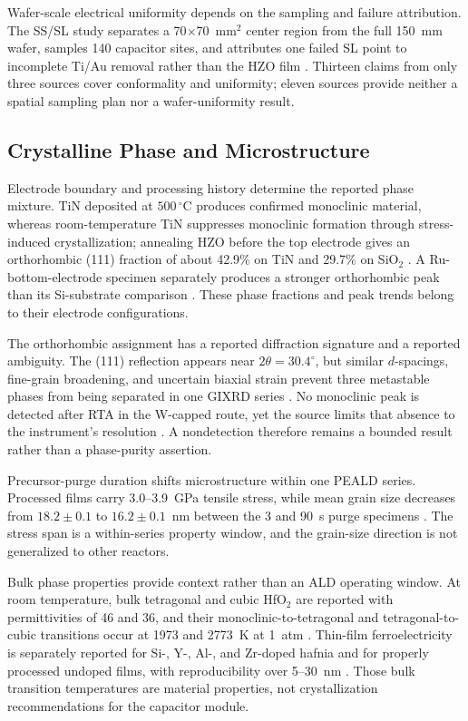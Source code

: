 \documentclass[11pt,a4paper]{report}
\begin{document}
Wafer-scale electrical uniformity depends on the sampling and failure attribution. The SS/SL study separates a 70$\times$70~mm$^2$ center region from the full 150~mm wafer, samples 140 capacitor sites, and attributes one failed SL point to incomplete Ti/Au removal rather than the HZO film \cite{kaatranen2026unif}. Thirteen claims from only three sources cover conformality and uniformity; eleven sources provide neither a spatial sampling plan nor a wafer-uniformity result.
\subsection{Crystalline Phase and Microstructure}
\label{sec:ald-crystalline-phase-parameter}

Electrode boundary and processing history determine the reported phase mixture. TiN deposited at $500\,^{\circ}$C produces confirmed monoclinic material, whereas room-temperature TiN suppresses monoclinic formation through stress-induced crystallization; annealing HZO before the top electrode gives an orthorhombic (111) fraction of about 42.9\% on TiN and 29.7\% on SiO$_2$ \cite{kim2020tin}. A Ru-bottom-electrode specimen separately produces a stronger orthorhombic peak than its Si-substrate comparison \cite{zhang2015inductive}. These phase fractions and peak trends belong to their electrode configurations.

The orthorhombic assignment has a reported diffraction signature and a reported ambiguity. The (111) reflection appears near $2\theta=30.4^\circ$, but similar $d$-spacings, fine-grain broadening, and uncertain biaxial strain prevent three metastable phases from being separated in one GIXRD series \cite{song2021ferro,choi2025purge}. No monoclinic peak is detected after RTA in the W-capped route, yet the source limits that absence to the instrument's resolution \cite{kashir2021wake}. A nondetection therefore remains a bounded result rather than a phase-purity assertion.

Precursor-purge duration shifts microstructure within one PEALD series. Processed films carry 3.0--3.9~GPa tensile stress, while mean grain size decreases from $18.2\pm0.1$ to $16.2\pm0.1$~nm between the 3 and 90~s purge specimens \cite{choi2025purge}. The stress span is a within-series property window, and the grain-size direction is not generalized to other reactors.

Bulk phase properties provide context rather than an ALD operating window. At room temperature, bulk tetragonal and cubic HfO$_2$ are reported with permittivities of 46 and 36, and their monoclinic-to-tetragonal and tetragonal-to-cubic transitions occur at 1973 and 2773~K at 1~atm \cite{mikolajick2018mrs}. Thin-film ferroelectricity is separately reported for Si-, Y-, Al-, and Zr-doped hafnia and for properly processed undoped films, with reproducibility over 5--30~nm \cite{mikolajick2018mrs}. Those bulk transition temperatures are material properties, not crystallization recommendations for the capacitor module.
\end{document}
